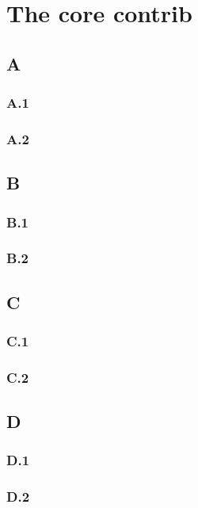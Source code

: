 \chapter{The core contrib}
\label{chap:core}
\ifpdf
    \graphicspath{{Chapter5/Figs/Raster/}{Chapter5/Figs/PDF/}{Chapter5/Figs/}}
\else
    \graphicspath{{Chapter5/Figs/Vector/}{Chapter5/Figs/}}
\fi

\section{A}
\subsection{A.1} 
\subsection{A.2} 
\section{B}
\subsection{B.1} 
\subsection{B.2} 
\section{C}
\subsection{C.1} 
\subsection{C.2} 
\section{D}
\subsection{D.1} 
\subsection{D.2} 
